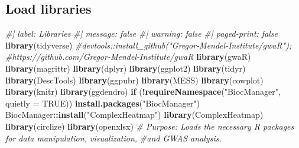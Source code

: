 \documentclass[
  11pt,
]{article}
\newenvironment{Shaded}{\begin{snugshade}}{\end{snugshade}}
\newcommand{\AttributeTok}[1]{\textcolor[rgb]{0.13,0.29,0.53}{#1}}
\newcommand{\CommentTok}[1]{\textcolor[rgb]{0.56,0.35,0.01}{\textit{#1}}}
\newcommand{\ConstantTok}[1]{\textcolor[rgb]{0.56,0.35,0.01}{#1}}
\newcommand{\ControlFlowTok}[1]{\textcolor[rgb]{0.13,0.29,0.53}{\textbf{#1}}}
\newcommand{\DocumentationTok}[1]{\textcolor[rgb]{0.56,0.35,0.01}{\textbf{\textit{#1}}}}
\newcommand{\FunctionTok}[1]{\textcolor[rgb]{0.13,0.29,0.53}{\textbf{#1}}}
\newcommand{\NormalTok}[1]{#1}
\newcommand{\SpecialCharTok}[1]{\textcolor[rgb]{0.81,0.36,0.00}{\textbf{#1}}}
\newcommand{\StringTok}[1]{\textcolor[rgb]{0.31,0.60,0.02}{#1}}
\begin{document}
\begin{Shaded}
\end{Shaded}

\subsection{Load libraries}\label{load-libraries}

\begin{Shaded}
\begin{Highlighting}[]
\CommentTok{\#| label: Libraries}
\CommentTok{\#| message: false}
\CommentTok{\#| warning: false}
\CommentTok{\#| paged{-}print: false}
\FunctionTok{library}\NormalTok{(tidyverse)}
\CommentTok{\#devtools::install\_github("Gregor{-}Mendel{-}Institute/gwaR"); }
\CommentTok{\#https://github.com/Gregor{-}Mendel{-}Institute/gwaR}
\FunctionTok{library}\NormalTok{(gwaR)}
\FunctionTok{library}\NormalTok{(magrittr)}
\FunctionTok{library}\NormalTok{(dplyr)}
\FunctionTok{library}\NormalTok{(ggplot2)}
\FunctionTok{library}\NormalTok{(tidyr)}
\FunctionTok{library}\NormalTok{(DescTools)}
\FunctionTok{library}\NormalTok{(ggpubr)}
\FunctionTok{library}\NormalTok{(MESS)}
\FunctionTok{library}\NormalTok{(cowplot)}
\FunctionTok{library}\NormalTok{(knitr)}
\FunctionTok{library}\NormalTok{(ggdendro)}
\ControlFlowTok{if}\NormalTok{ (}\SpecialCharTok{!}\FunctionTok{requireNamespace}\NormalTok{(}\StringTok{"BiocManager"}\NormalTok{, }\AttributeTok{quietly =} \ConstantTok{TRUE}\NormalTok{))}
    \FunctionTok{install.packages}\NormalTok{(}\StringTok{"BiocManager"}\NormalTok{)}
\NormalTok{BiocManager}\SpecialCharTok{::}\FunctionTok{install}\NormalTok{(}\StringTok{"ComplexHeatmap"}\NormalTok{)}
\FunctionTok{library}\NormalTok{(ComplexHeatmap)}
\FunctionTok{library}\NormalTok{(circlize)}
\FunctionTok{library}\NormalTok{(openxlsx)}
\CommentTok{\# Purpose: Loads the necessary R packages for data manipulation, visualization, }
\CommentTok{\#and GWAS analysis.}
\end{Highlighting}
\end{Shaded}
\end{document}
